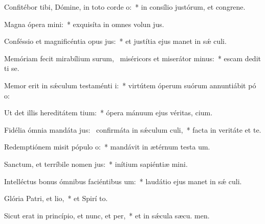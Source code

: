 \item Confitébor tibi, Dómine, in toto corde o:~* in consílio justórum, et congrene.
\item Magna ópera mini:~* exquisíta in omnes volun jus.
\item Conféssio et magnificéntia opus jus:~* et justítia ejus manet in sǽ culi.
\item Memóriam fecit mirabílium surum,~\pscross{} miséricors et miserátor minus:~* escam dedit ti se.
\item Memor erit in sǽculum testaménti i:~* virtútem óperum suórum annuntiábit pó o:
\item Ut det illis hereditátem tium:~* ópera mánuum ejus véritas,  cium.
\item Fidélia ómnia mandáta jus:~\pscross{} confirmáta in sǽculum culi,~* facta in veritáte et te.
\item Redemptiónem misit pópulo o:~* mandávit in ætérnum testa um.
\item Sanctum, et terríbile nomen jus:~* inítium sapiéntiæ  mini.
\item Intelléctus bonus ómnibus faciéntibus um:~* laudátio ejus manet in sǽ culi.
\item Glória Patri, et lio,~* et Spirí to.
\item Sicut erat in princípio, et nunc, et per,~* et in sǽcula sæcu. men.
